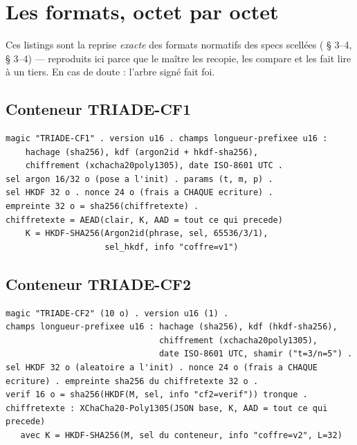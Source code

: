 \appendix
\section{Les formats, octet par octet}\label{sec:formats}

Ces listings sont la reprise \emph{exacte} des formats normatifs des specs scellées
( § 3--4,  § 3--4) — reproduits
ici parce que le maître les recopie, les compare et les fait lire à un tiers. En cas
de doute : l'arbre signé fait foi.

\subsection{Conteneur TRIADE-CF1}

\begin{lstlisting}
magic "TRIADE-CF1" . version u16 . champs longueur-prefixee u16 :
    hachage (sha256), kdf (argon2id + hkdf-sha256),
    chiffrement (xchacha20poly1305), date ISO-8601 UTC .
sel argon 16/32 o (pose a l'init) . params (t, m, p) .
sel HKDF 32 o . nonce 24 o (frais a CHAQUE ecriture) .
empreinte 32 o = sha256(chiffretexte) .
chiffretexte = AEAD(clair, K, AAD = tout ce qui precede)
    K = HKDF-SHA256(Argon2id(phrase, sel, 65536/3/1),
                    sel_hkdf, info "coffre=v1")
\end{lstlisting}

\subsection{Conteneur TRIADE-CF2}

\begin{lstlisting}
magic "TRIADE-CF2" (10 o) . version u16 (1) .
champs longueur-prefixee u16 : hachage (sha256), kdf (hkdf-sha256),
                               chiffrement (xchacha20poly1305),
                               date ISO-8601 UTC, shamir ("t=3/n=5") .
sel HKDF 32 o (aleatoire a l'init) . nonce 24 o (frais a CHAQUE
ecriture) . empreinte sha256 du chiffretexte 32 o .
verif 16 o = sha256(HKDF(M, sel, info "cf2=verif")) tronque .
chiffretexte : XChaCha20-Poly1305(JSON base, K, AAD = tout ce qui precede)
   avec K = HKDF-SHA256(M, sel du conteneur, info "coffre=v2", L=32)
\end{lstlisting}

